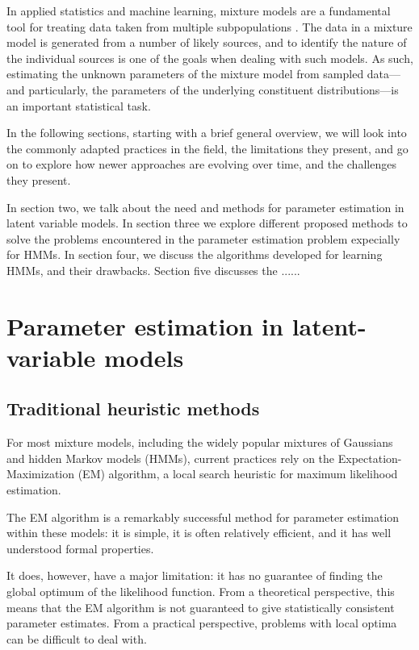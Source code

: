 In applied statistics and machine learning, mixture models are a fundamental tool for treating data taken from multiple subpopulations \cite{ref3}. The data in a mixture model is generated from a number of likely sources, and to identify the nature of the individual sources is one of the goals when dealing with such models. As such, estimating the unknown parameters of the mixture model from sampled data—and particularly, the parameters of the underlying constituent distributions—is an important statistical task. 

In the following sections, starting with a brief general overview, we will look into the commonly adapted practices in the field, the limitations they present, and go on to explore how newer approaches are evolving over time, and the challenges they present. 

In section two, we talk about the need and methods for parameter estimation in latent variable models. In section three we explore different proposed methods to solve the problems encountered in the parameter estimation problem expecially for HMMs. In section four, we discuss the algorithms developed for learning HMMs, and their drawbacks. Section five discusses the ......



\section{Parameter estimation in latent-variable models}

\subsection{Traditional heuristic methods}

For most mixture models, including the widely popular mixtures of Gaussians and hidden
Markov models (HMMs), current practices rely on the Expectation-Maximization (EM) algorithm,
a local search heuristic for maximum likelihood estimation.

The EM algorithm is a remarkably successful
method for parameter estimation within these models: it is simple, it is often relatively
efficient, and it has well understood formal properties.\cite{ref19} 

It does, however, have a major limitation: it has no guarantee of finding the global optimum of the likelihood function.
From a theoretical perspective, this means that the EM algorithm is not guaranteed to give
statistically consistent parameter estimates. From a practical perspective, problems with
local optima can be difficult to deal with.

